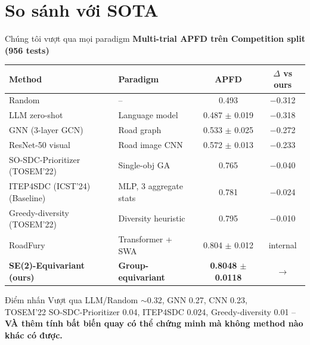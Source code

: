 \documentclass[aspectratio=169,10pt]{beamer}
\begin{document}
\section{So sánh với SOTA}

\begin{frame}{Chúng tôi vượt qua mọi paradigm}
\centering\tiny
\textbf{Multi-trial APFD trên Competition split (956 tests)}\\[0.4em]
\begin{tabular}{l l c c}
  \toprule
  \textbf{Method} & \textbf{Paradigm} & \textbf{APFD} & \textbf{$\Delta$ vs ours} \\
  \midrule
  Random                                & --                          & 0.493             & \textcolor{alert}{$-$0.312} \\
  LLM zero-shot                         & Language model              & 0.487 $\pm$ 0.019 & \textcolor{alert}{$-$0.318} \\
  GNN (3-layer GCN)                     & Road graph                  & 0.533 $\pm$ 0.025 & \textcolor{alert}{$-$0.272} \\
  ResNet-50 visual                      & Road image CNN              & 0.572 $\pm$ 0.013 & \textcolor{alert}{$-$0.233} \\
  SO-SDC-Prioritizer (TOSEM'22)         & Single-obj GA               & 0.765             & \textcolor{alert}{$-$0.040} \\
  ITEP4SDC (ICST'24) (Baseline)         & MLP, 3 aggregate stats      & 0.781             & \textcolor{alert}{$-$0.024} \\
  Greedy-diversity (TOSEM'22)            & Diversity heuristic         & 0.795             & \textcolor{alert}{$-$0.010} \\
  RoadFury                               & Transformer + SWA           & 0.804 $\pm$ 0.012 & internal \\
  \rowcolor{accent!15}
  \textbf{SE(2)-Equivariant (ours)}     & \textbf{Group-equivariant}  & \textbf{0.8048 $\pm$ 0.0118} & \cellcolor{success!15}\textbf{$\rightarrow$} \\
  \bottomrule
\end{tabular}

\vspace{0.7em}
\begin{block}{Điểm nhấn}
\scriptsize
Vượt qua LLM/Random $\sim$0.32, GNN 0.27, CNN 0.23,\\
TOSEM'22 SO-SDC-Prioritizer 0.04, ITEP4SDC 0.024, Greedy-diversity 0.01 --\\
\textbf{VÀ thêm tính bất biến quay có thể chứng minh mà không method nào khác có được.}
\end{block}
\end{frame}
\end{document}
